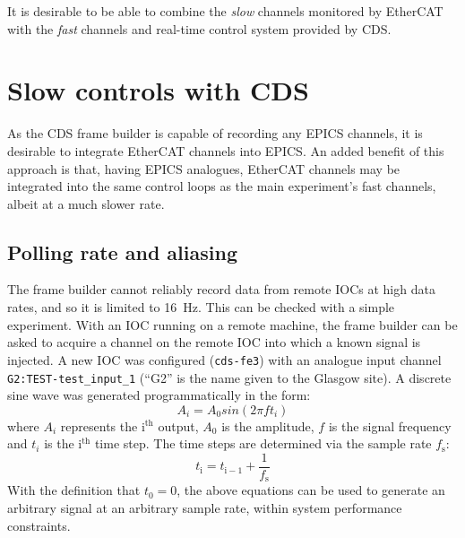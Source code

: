 It is desirable to be able to combine the \emph{slow} channels monitored by EtherCAT with the \emph{fast} channels and real-time control system provided by \gls{CDS}.

\section{Slow controls with CDS}
As the \gls{CDS} frame builder is capable of recording any \gls{EPICS} channels, it is desirable to integrate EtherCAT channels into \gls{EPICS}. An added benefit of this approach is that, having \gls{EPICS} analogues, EtherCAT channels may be integrated into the same control loops as the main experiment's fast channels, albeit at a much slower rate.

\subsection{Polling rate and aliasing}
The frame builder cannot reliably record data from remote \glspl{IOC} at high data rates, and so it is limited to \SI{16}{\hertz}. This can be checked with a simple experiment. With an \gls{IOC} running on a remote machine, the frame builder can be asked to acquire a channel on the remote \gls{IOC} into which a known signal is injected. A new \gls{IOC} was configured (\lstinline!cds-fe3!) with an analogue input channel \lstinline!G2:TEST-test_input_1! (``G2'' is the name given to the Glasgow site). A discrete sine wave was generated programmatically in the form:
\begin{equation}
  \label{eq:programmatic-sine}
  A_{i} = A_0 sin \left( 2 \pi f t_{i} \right)
\end{equation}
where $A_{i}$ represents the $\text{i}^{\text{th}}$ output, $A_0$ is the amplitude, $f$ is the signal frequency and $t_{i}$ is the $\text{i}^{\text{th}}$ time step. The time steps are determined via the sample rate $f_{\text{s}}$:
\begin{equation}
  \label{eq:programmatic-time-step}
  t_{\text{i}} = t_{\text{i}-1} + \frac{1}{f_{\text{s}}}
\end{equation}
With the definition that $t_{0} = 0$, the above equations can be used to generate an arbitrary signal at an arbitrary sample rate, within system performance constraints.

